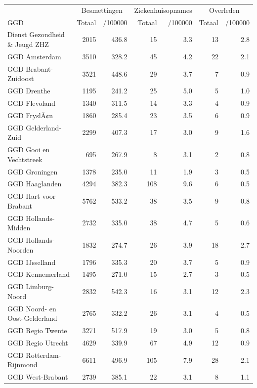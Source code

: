 \documentclass[
  english,
  man,floatsintext]{apa6}
\begin{document}
\begin{table}
\centering\begingroup\fontsize{10}{12}\selectfont

\begin{threeparttable}
\begin{tabular}{lrrrrrr}
\toprule
\multicolumn{1}{c}{ } & \multicolumn{2}{c}{Besmettingen} & \multicolumn{2}{c}{Ziekenhuisopnames} & \multicolumn{2}{c}{Overleden} \\
\cmidrule(l{3pt}r{3pt}){2-3} \cmidrule(l{3pt}r{3pt}){4-5} \cmidrule(l{3pt}r{3pt}){6-7}
GGD & Totaal & /100000 & Totaal & /100000 & Totaal & /100000\\
\midrule
Dienst Gezondheid \& Jeugd ZHZ & 2015 & 436.8 & 15 & 3.3 & 13 & 2.8\\
GGD Amsterdam & 3510 & 328.2 & 45 & 4.2 & 22 & 2.1\\
GGD Brabant-Zuidoost & 3521 & 448.6 & 29 & 3.7 & 7 & 0.9\\
GGD Drenthe & 1195 & 241.2 & 25 & 5.0 & 5 & 1.0\\
GGD Flevoland & 1340 & 311.5 & 14 & 3.3 & 4 & 0.9\\
GGD FryslÃ¢n & 1860 & 285.4 & 23 & 3.5 & 6 & 0.9\\
GGD Gelderland-Zuid & 2299 & 407.3 & 17 & 3.0 & 9 & 1.6\\
GGD Gooi en Vechtstreek & 695 & 267.9 & 8 & 3.1 & 2 & 0.8\\
GGD Groningen & 1378 & 235.0 & 11 & 1.9 & 3 & 0.5\\
GGD Haaglanden & 4294 & 382.3 & 108 & 9.6 & 6 & 0.5\\
GGD Hart voor Brabant & 5762 & 533.2 & 38 & 3.5 & 9 & 0.8\\
GGD Hollands-Midden & 2732 & 335.0 & 38 & 4.7 & 5 & 0.6\\
GGD Hollands-Noorden & 1832 & 274.7 & 26 & 3.9 & 18 & 2.7\\
GGD IJsselland & 1796 & 335.3 & 20 & 3.7 & 5 & 0.9\\
GGD Kennemerland & 1495 & 271.0 & 15 & 2.7 & 3 & 0.5\\
GGD Limburg-Noord & 2832 & 542.3 & 16 & 3.1 & 12 & 2.3\\
GGD Noord- en Oost-Gelderland & 2765 & 332.2 & 26 & 3.1 & 4 & 0.5\\
GGD Regio Twente & 3271 & 517.9 & 19 & 3.0 & 5 & 0.8\\
GGD Regio Utrecht & 4629 & 339.9 & 67 & 4.9 & 12 & 0.9\\
GGD Rotterdam-Rijnmond & 6611 & 496.9 & 105 & 7.9 & 28 & 2.1\\
GGD West-Brabant & 2739 & 385.1 & 22 & 3.1 & 8 & 1.1\\

\end{tabular}
\end{threeparttable}
\end{table}
\end{document}
